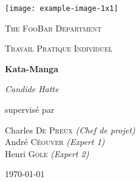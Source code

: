 \begin{titlepage}
	\centering
	\texttt{[image: example-image-1x1]}\par\vspace{1cm}
	{\scshape The FooBar Department \par}
	\vspace{1cm}
	{\scshape\Large Travail Pratique Individuel\par}
	\vspace{1.5cm}
	{\huge\bfseries Kata-Manga\par}
	\vspace{2cm}
	{\Large\itshape Candide Hatte\par}
	\vfill
	supervisé par\par
	Charles \textsc{De Preux} {\itshape(Chef de projet)}\\
	André \textsc{Céouver} {\itshape(Expert 1)}\\
	Henri \textsc{Gole} {\itshape(Expert 2)}

	\vfill

	{\large \today\par}
\end{titlepage}
